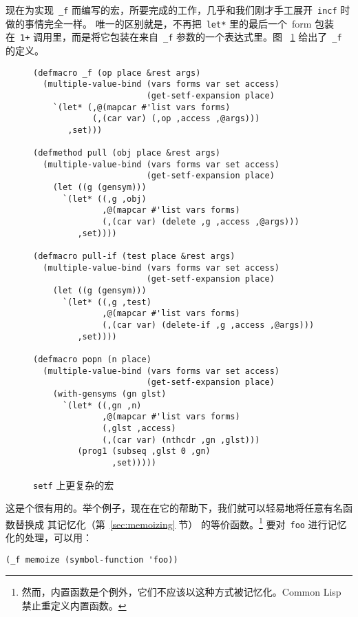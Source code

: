 现在为实现~\verb|_f| 而编写的宏，所要完成的工作，几乎和我们刚才手工展开~\verb|incf| 时做的事情完全一样。
唯一的区别就是，不再把~\verb|let*| 里的最后一个~form 包装在~\verb|1+|
调用里，而是将它包装在来自~\verb|_f| 参数的一个表达式里。图
~\ref{fig:more_complex_macros_on_setf} 给出了~\verb|_f| 的定义。

\begin{figure}
\begin{lstlisting}
(defmacro _f (op place &rest args)
  (multiple-value-bind (vars forms var set access)
                       (get-setf-expansion place)
    `(let* (,@(mapcar #'list vars forms)
            (,(car var) (,op ,access ,@args)))
       ,set)))

(defmethod pull (obj place &rest args)
  (multiple-value-bind (vars forms var set access)
                       (get-setf-expansion place)
    (let ((g (gensym)))
      `(let* ((,g ,obj)
              ,@(mapcar #'list vars forms)
              (,(car var) (delete ,g ,access ,@args)))
         ,set))))

(defmacro pull-if (test place &rest args)
  (multiple-value-bind (vars forms var set access)
                       (get-setf-expansion place)
    (let ((g (gensym)))
      `(let* ((,g ,test)
              ,@(mapcar #'list vars forms)
              (,(car var) (delete-if ,g ,access ,@args)))
         ,set))))

(defmacro popn (n place)
  (multiple-value-bind (vars forms var set access)
                       (get-setf-expansion place)
    (with-gensyms (gn glst)
      `(let* ((,gn ,n)
              ,@(mapcar #'list vars forms)
              (,glst ,access)
              (,(car var) (nthcdr ,gn ,glst)))
         (prog1 (subseq ,glst 0 ,gn)
                ,set)))))
\end{lstlisting}
  \caption{\texttt{setf} 上更复杂的宏}
  \label{fig:more_complex_macros_on_setf}
\end{figure}

这是个很有用的\utility{}。举个例子，现在在它的帮助下，我们就可以轻易地将任意有名函数替换成
其记忆化（第~\ref{sec:memoizing} 节） 的等价函数。\footnote{
然而，内置函数是个例外，它们不应该以这种方式被记忆化。Common Lisp 禁止重定义内置函数。}
要对~\verb|foo| 进行记忆化的处理，可以用：
\begin{lstlisting}
(_f memoize (symbol-function 'foo))
\end{lstlisting}

